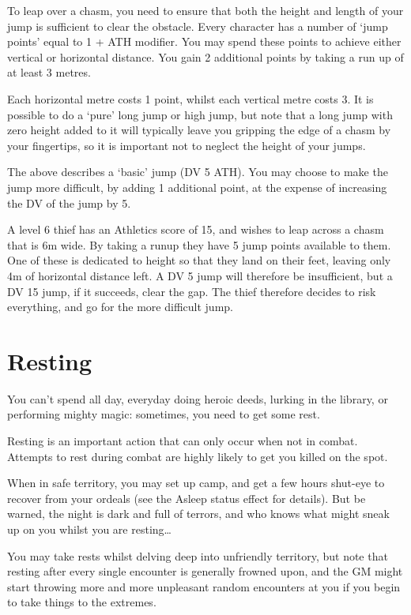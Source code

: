 To leap over a chasm, you need to ensure that both the height and length of your jump is sufficient to clear the obstacle. Every character has a number of `jump points' equal to 1 + ATH modifier. You may spend these points to achieve either vertical or horizontal distance. You gain 2 additional points by taking a run up of at least 3 metres. 

Each horizontal metre costs 1 point, whilst each vertical metre costs 3.  It is possible to do a `pure' long jump or high jump, but note that a long jump with zero height added to it will typically leave you gripping the edge of a chasm by your fingertips, so it is important not to neglect the height of your jumps. 

The above describes a `basic' jump (DV 5 ATH). You may choose to make the jump more difficult, by adding 1 additional point, at the expense of increasing the DV of the jump by 5. 

A level 6 thief has an Athletics score of 15, and wishes to leap across a chasm that is 6m wide. By taking a runup they have 5 jump points available to them. One of these is dedicated to height so that they land on their feet, leaving only 4m of horizontal distance left. A DV 5 jump will therefore be insufficient, but a DV 15 jump, if it succeeds, clear the gap. The thief therefore decides to risk everything, and go for the more difficult jump. 




\section{Resting}

You can't spend all day, everyday doing heroic deeds, lurking in the library, or performing mighty magic: sometimes, you need to get some rest. 

Resting is an important action that can only occur when not in combat. Attempts to rest during combat are highly likely to get you killed on the spot. 

When in safe territory, you may set up camp, and get a few hours shut-eye to recover from your ordeals (see the Asleep status effect for details). But be warned, the night is dark and full of terrors, and who knows what might sneak up on you whilst you are resting…

You may take rests whilst delving deep into unfriendly territory, but note that resting after every single encounter is generally frowned upon, and the GM might start throwing more and more unpleasant random encounters at you if you begin to take things to the extremes. 

